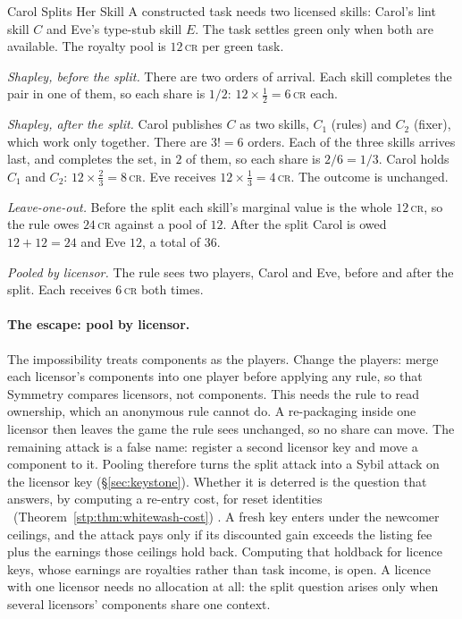 \begin{pdexample}{Carol Splits Her Skill}
\setlength{\parskip}{4pt plus 1pt}
A constructed task needs two licensed skills: Carol's lint skill $C$ and
Eve's type-stub skill $E$. The task settles green only when both are
available. The royalty pool is $12$\,\textsc{cr} per green task.

\emph{Shapley, before the split.} There are two orders of arrival. Each skill
completes the pair in one of them, so each share is $1/2$:
$12\times\tfrac12=6$\,\textsc{cr} each.

\emph{Shapley, after the split.} Carol publishes $C$ as two skills, $C_1$
(rules) and $C_2$ (fixer), which work only together. There are $3!=6$ orders.
Each of the three skills arrives last, and completes the set, in $2$ of
them, so each share is $2/6=1/3$. Carol holds $C_1$ and $C_2$:
$12\times\tfrac23=8$\,\textsc{cr}. Eve receives
$12\times\tfrac13=4$\,\textsc{cr}. The outcome is unchanged.

\emph{Leave-one-out.} Before the split each skill's marginal value is the
whole $12$\,\textsc{cr}, so the rule owes $24$\,\textsc{cr} against a pool
of $12$. After the split Carol is owed $12+12=24$ and Eve $12$, a total of
$36$.

\emph{Pooled by licensor.} The rule sees two players, Carol and Eve, before
and after the split. Each receives $6$\,\textsc{cr} both times.
\end{pdexample}

\paragraph{The escape: pool by licensor.}
The impossibility treats components as the players. Change the players: merge
each licensor's components into one player before applying any rule, so that
Symmetry compares licensors, not components. This needs the rule to read
ownership, which an anonymous rule cannot do. A re-packaging inside one
licensor then leaves the game the rule sees unchanged, so no share can move. The remaining attack is a false name: register a second licensor key
and move a component to it. Pooling therefore turns the split attack into a
Sybil attack on the licensor key (\S\ref{sec:keystone}). Whether it is
deterred is the question that  answers,
by computing a re-entry cost, for reset identities%
\ifpdbook
\ (Theorem~\ref{stp:thm:whitewash-cost})%
\fi
. A fresh key enters under the newcomer ceilings, and the attack pays only
if its discounted gain exceeds the listing fee plus the earnings those
ceilings hold back. Computing that holdback for licence keys, whose earnings
are royalties rather than task income, is open. A licence with one licensor
needs no allocation at all: the split question arises only when several
licensors' components share one context.

